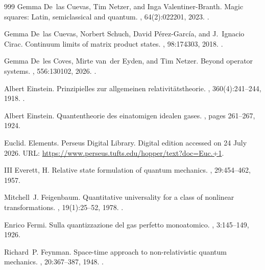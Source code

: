 \begin{thebibliography}{999}
Gemma De~las Cuevas, Tim Netzer, and Inga Valentiner-Branth.
\newblock Magic squares: Latin, semiclassical and quantum.
, 64(2):022201, 2023.
\newblock \href {https://doi.org/10.1063/5.0127393}
  {}.

Gemma De~las Cuevas, Norbert Schuch, David P{\'e}rez-Garc{\'i}a, and J.~Ignacio
  Cirac.
\newblock Continuum limits of matrix product states.
, 98:174303, 2018.
\newblock \href {https://doi.org/10.1103/PhysRevB.98.174303}
  {}.

Gemma De~les Coves, Mirte van~der Eyden, and Tim Netzer.
\newblock Beyond operator systems.
, 556:130102,
  2026.
\newblock \href {https://doi.org/10.1016/j.jmaa.2025.130102}
  {}.

Albert Einstein.
\newblock Prinzipielles zur allgemeinen relativitätstheorie.
, 360(4):241--244, 1918.
\newblock \href {https://doi.org/10.1002/andp.19183600402}
  {}.

 Albert Einstein.
\newblock Quantentheorie des einatomigen idealen gases.
,
  pages 261--267, 1924.

Euclid.
\newblock Elements.
\newblock Perseus Digital Library.
\newblock Digital edition accessed on 24 July 2026.
\newblock URL: \url{https://www.perseus.tufts.edu/hopper/text?doc=Euc.+1}.

III Everett, H.
\newblock Relative state formulation of quantum mechanics.
, 29:454--462, 1957.

Mitchell~J. Feigenbaum.
\newblock Quantitative universality for a class of nonlinear transformations.
, 19(1):25--52, 1978.
\newblock \href {https://doi.org/10.1007/BF01020332}
  {}.

 Enrico Fermi.
\newblock Sulla quantizzazione del gas perfetto monoatomico.
, 3:145--149, 1926.

Richard~P. Feynman.
\newblock Space-time approach to non-relativistic quantum mechanics.
, 20:367--387, 1948.
\newblock \href {https://doi.org/10.1103/RevModPhys.20.367}
  {}.


\end{thebibliography}
